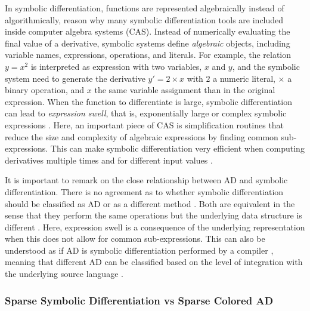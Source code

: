 In symbolic differentiation, functions are represented algebraically instead of algorithmically, reason why many symbolic differentiation tools are included inside computer algebra systems (CAS)\cite{Symbolics_jl_2022}. 
Instead of numerically evaluating the final value of a derivative, symbolic systems define \textit{algebraic} objects, including variable names, expressions, operations, and literals. 
For example, the relation $y = x^2$ is interpreted as expression with two variables, $x$ and $y$, and the symbolic system need to generate the derivative $y' = 2 \times x$ with $2$ a numeric literal, $\times$ a binary operation, and $x$ the same variable assignment than in the original expression.
When the function to differentiate is large, symbolic differentiation can lead to \textit{expression swell}, that is, exponentially large or complex symbolic expressions \cite{Baydin_Pearlmutter_Radul_Siskind_2015}.
Here, an important piece of CAS is simplification routines that reduce the size and complexity of algebraic expressions by finding common sub-expressions.  
This can make symbolic differentiation very efficient when computing derivatives multiple times and for different input values \cite{Dürrbaum_Klier_Hahn_2002}. 

It is important to remark on the close relationship between AD and symbolic differentiation.
There is no agreement as to whether symbolic differentiation should be classified as AD\cite{juedes1991taxonomy, Elliott_2018, Laue2020} or as a different method \cite{Baydin_Pearlmutter_Radul_Siskind_2015}.  
Both are equivalent in the sense that they perform the same operations but the underlying data structure is different \cite{Laue2020}. 
Here, expression swell is a consequence of the underlying representation when this does not allow for common sub-expressions. 
This can also be understood as if AD is symbolic differentiation performed by a compiler \cite{Elliott_2018}, meaning that different AD can be classified based on the level of integration with the underlying source language \cite{juedes1991taxonomy}.

\subsubsection{Sparse Symbolic Differentiation vs Sparse Colored AD}

